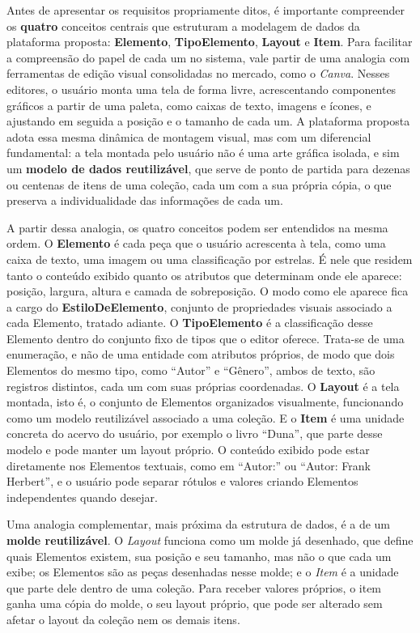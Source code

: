 Antes de apresentar os requisitos propriamente ditos, é importante compreender os \textbf{quatro} conceitos centrais que estruturam a modelagem de dados da
plataforma proposta: \textbf{Elemento}, \textbf{TipoElemento}, \textbf{Layout} e \textbf{Item}. Para facilitar a compreensão do papel de cada um no sistema,
vale partir de uma analogia com ferramentas de edição visual consolidadas no mercado, como o \textit{Canva}. Nesses editores, o usuário monta uma tela de
forma livre, acrescentando componentes gráficos a partir de uma paleta, como caixas de texto, imagens e ícones, e ajustando em seguida a posição e o tamanho
de cada um. A plataforma proposta adota essa mesma dinâmica de montagem visual, mas com um diferencial fundamental: a tela montada pelo usuário não é uma
arte gráfica isolada, e sim um \textbf{modelo de dados reutilizável}, que serve de ponto de partida para dezenas ou centenas de itens de uma coleção,
cada um com a sua própria cópia, o que preserva a individualidade das informações de cada um.

A partir dessa analogia, os quatro conceitos podem ser entendidos na mesma ordem. O \textbf{Elemento} é cada peça que o usuário acrescenta à tela, como uma
caixa de texto, uma imagem ou uma classificação por estrelas. É nele que residem tanto o conteúdo exibido quanto os atributos que determinam onde ele
aparece: posição, largura, altura e camada de sobreposição. O modo como ele aparece fica a cargo do \textbf{EstiloDeElemento}, conjunto de propriedades
visuais associado a cada Elemento, tratado adiante. O \textbf{TipoElemento} é a classificação desse Elemento dentro
do conjunto fixo de tipos que o editor oferece. Trata-se de uma enumeração, e não de uma entidade com atributos próprios, de modo que dois Elementos do
mesmo tipo, como ``Autor'' e ``Gênero'', ambos de texto, são registros distintos, cada um com suas próprias coordenadas. O \textbf{Layout} é a tela montada,
isto é, o conjunto de Elementos organizados visualmente, funcionando como um modelo reutilizável associado a uma coleção. E o \textbf{Item} é uma unidade
concreta do acervo do usuário, por exemplo o livro ``Duna'', que parte desse modelo e pode manter um layout próprio. O conteúdo exibido pode estar
diretamente nos Elementos textuais, como em ``Autor:'' ou ``Autor: Frank Herbert'', e o usuário pode separar rótulos e valores criando Elementos
independentes quando desejar.

Uma analogia complementar, mais próxima da estrutura de dados, é a de um \textbf{molde reutilizável}. O \textit{Layout} funciona como um molde já
desenhado, que define quais Elementos existem, sua posição e seu tamanho, mas não o que cada um exibe; os Elementos são as peças desenhadas nesse molde; e o
\textit{Item} é a unidade que parte dele dentro de uma coleção. Para receber valores próprios, o item ganha uma cópia do molde, o seu layout próprio,
que pode ser alterado sem afetar o layout da coleção nem os demais itens.

